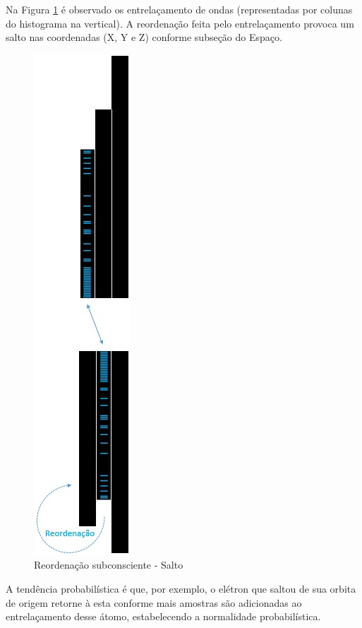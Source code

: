 Na Figura \ref{fig:consciousness_space_subconscious_observation_jump} é observado os entrelaçamento de ondas (representadas por colunas do histograma na vertical). A reordenação feita pelo entrelaçamento provoca um salto nas coordenadas (X, Y e Z) conforme subseção do Espaço.
	\begin{figure}[H]
	\caption{Reordenação subconsciente - Salto}
	\label{fig:consciousness_space_subconscious_observation_jump}
	\centering
	\includegraphics[scale=.6]{sections/images/consciousness_space_subconscious_observation_jump.jpg}
	\end{figure}

A tendência probabilística é que, por exemplo, o elétron que saltou de sua orbita de origem retorne à esta conforme mais amostras são adicionadas ao entrelaçamento desse átomo, estabelecendo a normalidade probabilística.

